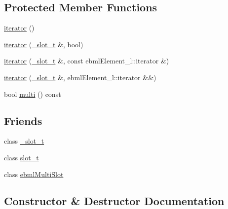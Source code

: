 \subsection*{Protected Member Functions}
\begin{DoxyCompactItemize}
\item 
\mbox{\hyperlink{classebml_1_1slot__t_1_1iterator_a4e5b492e3db65a574c7fae4e624fc3bb}{iterator}} ()
\item 
\mbox{\hyperlink{classebml_1_1slot__t_1_1iterator_a0984d8894ecc7ec4a705a25d99fc6a58}{iterator}} (\mbox{\hyperlink{classebml_1_1slot__t_1_1iterator_a03124469c35c80a29b81b969706999df}{\+\_\+slot\+\_\+t}} \&, bool)
\item 
\mbox{\hyperlink{classebml_1_1slot__t_1_1iterator_a2da001978feb19887d25232fc13b1c1a}{iterator}} (\mbox{\hyperlink{classebml_1_1slot__t_1_1iterator_a03124469c35c80a29b81b969706999df}{\+\_\+slot\+\_\+t}} \&, const ebml\+Element\+\_\+l\+::iterator \&)
\item 
\mbox{\hyperlink{classebml_1_1slot__t_1_1iterator_a0cc73a3a11d6dadba263947d30b0ecc1}{iterator}} (\mbox{\hyperlink{classebml_1_1slot__t_1_1iterator_a03124469c35c80a29b81b969706999df}{\+\_\+slot\+\_\+t}} \&, ebml\+Element\+\_\+l\+::iterator \&\&)
\item 
bool \mbox{\hyperlink{classebml_1_1slot__t_1_1iterator_a63e80838d46ce19e7cad3c0edf78efe0}{multi}} () const
\end{DoxyCompactItemize}
\subsection*{Friends}
\begin{DoxyCompactItemize}
\item 
class \mbox{\hyperlink{classebml_1_1slot__t_1_1iterator_a03124469c35c80a29b81b969706999df}{\+\_\+slot\+\_\+t}}
\item 
class \mbox{\hyperlink{classebml_1_1slot__t_1_1iterator_a6546cbde3dc2846c329fd0ea73da851b}{slot\+\_\+t}}
\item 
class \mbox{\hyperlink{classebml_1_1slot__t_1_1iterator_ab14eb6c5a125d7276a7b4b5b6573428b}{ebml\+Multi\+Slot}}
\end{DoxyCompactItemize}


\subsection{Constructor \& Destructor Documentation}
\mbox{\label{classebml_1_1slot__t_1_1iterator_a4e5b492e3db65a574c7fae4e624fc3bb}} 

